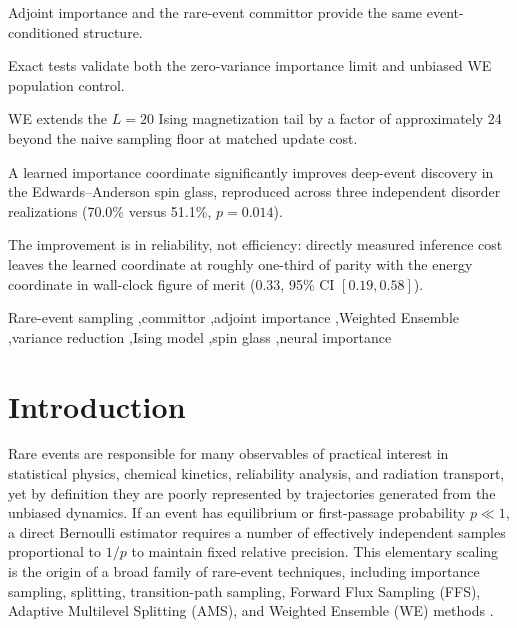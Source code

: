 \documentclass[a4paper,fleqn]{cas-sc}
\begin{document}
\begin{highlights}
\item Adjoint importance and the rare-event committor provide the same event-conditioned structure.
\item Exact tests validate both the zero-variance importance limit and unbiased WE population control.
\item WE extends the $L=20$ Ising magnetization tail by a factor of approximately 24 beyond the naive sampling floor at matched update cost.
\item A learned importance coordinate significantly improves deep-event discovery in the Edwards--Anderson spin glass, reproduced across three independent disorder realizations (70.0\% versus 51.1\%, $p=0.014$).
\item The improvement is in reliability, not efficiency: directly measured inference cost leaves the learned coordinate at roughly one-third of parity with the energy coordinate in wall-clock figure of merit ($0.33$, 95\% CI $[0.19,0.58]$).
\end{highlights}

\begin{keywords}
Rare-event sampling \sep committor \sep adjoint importance \sep Weighted Ensemble \sep variance reduction \sep Ising model \sep spin glass \sep neural importance
\end{keywords}
\maketitle
\section{Introduction}\label{sec:intro}
Rare events are responsible for many observables of practical interest in statistical physics, chemical kinetics, reliability analysis, and radiation transport, yet by definition they are poorly represented by trajectories generated from the unbiased dynamics. If an event has equilibrium or first-passage probability $p\ll1$, a direct Bernoulli estimator requires a number of effectively independent samples proportional to $1/p$ to maintain fixed relative precision. This elementary scaling is the origin of a broad family of rare-event techniques, including importance sampling, splitting, transition-path sampling, Forward Flux Sampling (FFS), Adaptive Multilevel Splitting (AMS), and Weighted Ensemble (WE) methods \citep{kahn1951,kalos2008,bolhuis2002,allen2009,cerou2007,huber1996,zuckerman2017}.
\end{document}
